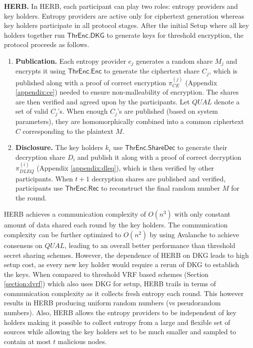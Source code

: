 \documentclass[letterpaper,twocolumn,10pt]{article}
\theoremstyle{definition}
\theoremstyle{remark}
\begin{document}
\noindent\textbf{HERB.} In HERB, each participant can play two roles: entropy providers and key holders. Entropy providers are active only for ciphertext generation whereas key holders participate in all protocol stages. After the initial Setup where all key holders together run $\mathsf{ThrEnc.DKG}$ to generate keys for threshold encryption, the protocol proceeds as follows.
\begin{enumerate}
    \item \textbf{Publication.} Each entropy provider $e_j$ generates a random share $M_j$ and encrypts it using $\mathsf{ThrEnc.Enc}$ to generate the ciphertext share $C_j$, which is published along with a proof of correct encryption $\pi_{CE}^{(j)}$ (Appendix \ref{appendix:ce}) needed to ensure non-malleability of encryption. The shares are then verified and agreed upon by the participants. Let $QUAL$ denote a set of valid $C_j$'s. When enough $C_j$'s are published (based on system parameters), they are homomorphically combined into a common ciphertext $C$ corresponding to the plaintext $M$.
    
    \item \textbf{Disclosure.} The key holders $k_i$ use $\mathsf{ThrEnc.ShareDec}$ to generate their decryption share $D_i$ and publish it along with a proof of correct decryption $\pi_{DLEQ}^{(i)}$ (Appendix \ref{appendix:dleq}), which is then verified by other participants. When $t + 1$ decryption shares are published and verified, participants use $\mathsf{ThrEnc.Rec}$ to reconstruct the final random number $M$ for the round.
\end{enumerate}

HERB achieves a communication complexity of $O(n^3)$ with only constant amount of data shared each round by the key holders. The communication complexity can be further optimized to $O(n^2)$ by using Avalanche \cite{rocket2018snowflake} to achieve consensus on $QUAL$, leading to an overall better performance than threshold secret sharing schemes. However, the dependence of HERB on DKG leads to high setup cost, as every new key holder would require a rerun of DKG to establish the keys. When compared to threshold VRF based schemes (Section \ref{section:dvrf}) which also uses DKG for setup, HERB trails in terms of communication complexity as it collects fresh entropy each round. This however results in HERB producing uniform random numbers (vs pseudorandom numbers). Also, HERB allows the entropy providers to be independent of key holders making it possible to collect entropy from a large and flexible set of sources while allowing the key holders set to be much smaller and sampled to contain at most $t$ malicious nodes.
\end{document}

